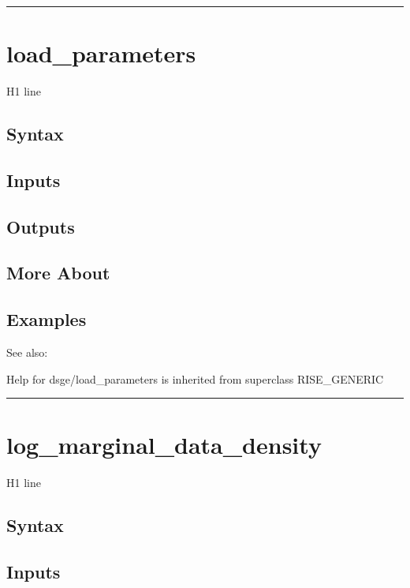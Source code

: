 \documentclass[letterpaper,10pt,english]{sphinxmanual}
\begin{document}
\bigskip\hrule{}\bigskip



\section{load\_parameters}
\label{classes/models/@dsge/dsge:id96}\label{classes/models/@dsge/dsge:load-parameters}
H1 line


\subsection{Syntax}
\label{classes/models/@dsge/dsge:id97}

\subsection{Inputs}
\label{classes/models/@dsge/dsge:id98}

\subsection{Outputs}
\label{classes/models/@dsge/dsge:id99}

\subsection{More About}
\label{classes/models/@dsge/dsge:id100}

\subsection{Examples}
\label{classes/models/@dsge/dsge:id101}
See also:

Help for dsge/load\_parameters is inherited from superclass RISE\_GENERIC


\bigskip\hrule{}\bigskip



\section{log\_marginal\_data\_density}
\label{classes/models/@dsge/dsge:id102}\label{classes/models/@dsge/dsge:log-marginal-data-density}
H1 line


\subsection{Syntax}
\label{classes/models/@dsge/dsge:id103}

\subsection{Inputs}
\label{classes/models/@dsge/dsge:id104}
\end{document}
